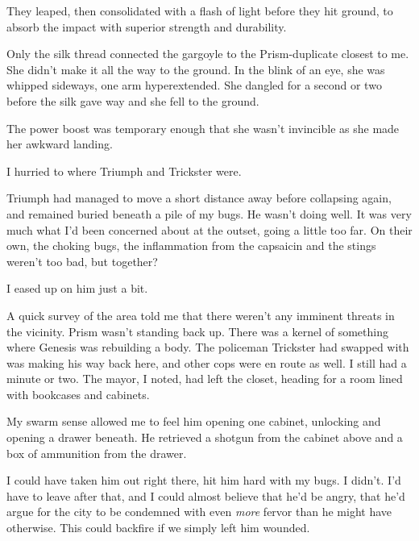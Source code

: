They leaped, then consolidated with a flash of light before they hit ground, to absorb the impact with superior strength and durability.



Only the silk thread connected the gargoyle to the Prism-duplicate closest to me.  She didn't make it all the way to the ground.  In the blink of an eye, she was whipped sideways, one arm hyperextended.  She dangled for a second or two before the silk gave way and she fell to the ground.



The power boost was temporary enough that she wasn't invincible as she made her awkward landing.



I hurried to where Triumph and Trickster were.



Triumph had managed to move a short distance away before collapsing again, and remained buried beneath a pile of my bugs.  He wasn't doing well.  It was very much what I'd been concerned about at the outset, going a little too far.  On their own, the choking bugs, the inflammation from the capsaicin and the stings weren't too bad, but together?



I eased up on him just a bit.



A quick survey of the area told me that there weren't any imminent threats in the vicinity.  Prism wasn't standing back up.  There was a kernel of something where Genesis was rebuilding a body.  The policeman Trickster had swapped with was making his way back here, and other cops were en route as well.  I still had a minute or two.  The mayor, I noted, had left the closet, heading for a room lined with bookcases and cabinets.



My swarm sense allowed me to feel him opening one cabinet, unlocking and opening a drawer beneath.  He retrieved a shotgun from the cabinet above and a box of ammunition from the drawer.



I could have taken him out right there, hit him hard with my bugs.  I didn't.  I'd have to leave after that, and I could almost believe that he'd be angry, that he'd argue for the city to be condemned with even \emph{more} fervor than he might have otherwise.  This could backfire if we simply left him wounded.



